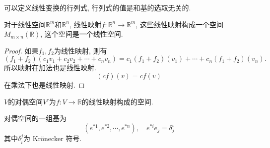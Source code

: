 
可以定义线性变换的行列式, 行列式的值是和基的选取无关的.

对于线性空间$\mathbb{R}^{m}$和$\mathbb{R}^{n}$, 线性映射$f\colon \mathbb{R}^{n} \to  \mathbb{R}^{m}$, 这些线性映射构成一个空间$M_{m \times n}\left( \mathbb{R} \right) $, 这个空间是一个线性空间.
\begin{proof}
    如果$f_1, f_2$为线性映射, 则有
    \begin{equation}
      \left( f_1 + f_2 \right) \left( c_1v_1 + c_2v_2+ \cdots + c_n v_n \right) = c_1 \left( f_1 + f_2 \right) \left( v_1 \right) + \cdots + c_n \left( f_1 + f_2 \right) \left( v_n \right) .
    \end{equation}
    所以映射在加法也是线性映射.
    \begin{equation}
      \left( cf \right) \left( v \right) = c f\left( v \right) 
    \end{equation}
    在乘法下也是线性映射.
\end{proof}

\begin{definition}
    $V$的对偶空间$V'$为$f\colon V\to \mathbb{R}$的线性映射构成的空间.
\end{definition}
对偶空间的一组基为
\begin{equation}
  \left( e^{*1},e^{*2},\cdots,e^{*n} \right) , \quad e^{*i} e_j = \delta_{j}^{i}
\end{equation}
其中$\delta^{j}_{i}$为 Kr\"onecker 符号.